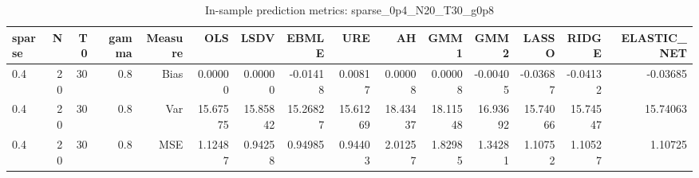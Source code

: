 \begin{table}[!htbp]\centering
\caption{In-sample prediction metrics: sparse_0p4_N20_T30_g0p8}
\label{tab:table2_sparse_0p4_N20_T30_g0p8}
\begin{tabular}{lrrrrrrrrrrrrrr}
\hline
sparse & N & T0 & gamma & Measure & OLS & LSDV & EBMLE & URE & AH & GMM1 & GMM2 & LASSO & RIDGE & ELASTIC_NET \\
\hline
0.4 & 20 & 30 & 0.8 & Bias & 0.00000 & 0.00000 & -0.01418 & 0.00817 & 0.00008 & 0.00008 & -0.00405 & -0.03687 & -0.04132 & -0.03685 \\
0.4 & 20 & 30 & 0.8 & Var & 15.67575 & 15.85842 & 15.26827 & 15.61269 & 18.43437 & 18.11548 & 16.93692 & 15.74066 & 15.74547 & 15.74063 \\
0.4 & 20 & 30 & 0.8 & MSE & 1.12487 & 0.94258 & 0.94985 & 0.94403 & 2.01257 & 1.82985 & 1.34281 & 1.10752 & 1.10527 & 1.10725 \\
\hline
\end{tabular}
\end{table}

